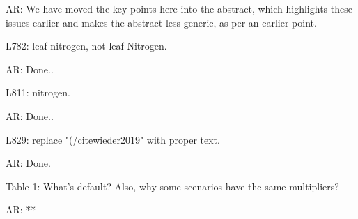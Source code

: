 \documentclass{article}
\begin{document}
\textsf{AR: We have moved the key points here into the abstract, which highlights these issues earlier and makes the abstract less generic, as per an earlier point.}

L782: leaf nitrogen, not leaf Nitrogen. 

\textsf{AR: Done..} 

L811: nitrogen. 

\textsf{AR: Done..} 

L829: replace "(/citewieder2019" with proper text. 

\textsf{AR: Done.} 

Table 1: What's default? Also, why some scenarios have the same multipliers? 

\textsf{AR: ** }
\end{document}
